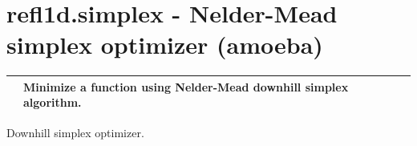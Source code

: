 \documentclass[letterpaper,10pt,english]{sphinxmanual}
\begin{document}
\section{refl1d.simplex - Nelder-Mead simplex optimizer (amoeba)}
\label{api/simplex:refl1d-simplex-nelder-mead-simplex-optimizer-amoeba}\label{api/simplex::doc}
\begin{tabulary}{\linewidth}{LL}
\hline

{\hyperref[api/simplex:refl1d.simplex.simplex]{}}
 & 
Minimize a function using Nelder-Mead downhill simplex algorithm.
\\
\hline
\end{tabulary}

\label{api/simplex:module-refl1d.simplex}
Downhill simplex optimizer.
\end{document}

